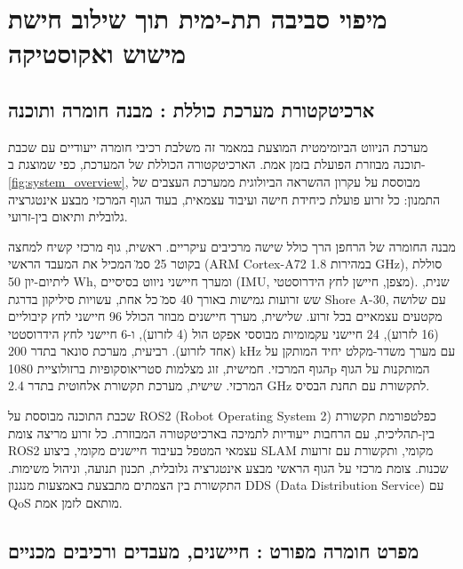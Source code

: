 

\section{מיפוי סביבה תת-ימית תוך שילוב חישת מישוש ואקוסטיקה}
\label{sec:ch07_mapping}

\subsection{ארכיטקטורת מערכת כוללת : מבנה חומרה ותוכנה}
\label{sec:ch07_architecture}

מערכת הניווט הביומימטית המוצעת במאמר זה משלבת רכיבי חומרה ייעודיים עם שכבת תוכנה מבוזרת הפועלת בזמן אמת. הארכיטקטורה הכוללת של המערכת, כפי שמוצגת ב-\ref{fig:system_overview}, מבוססת על עקרון ההשראה הביולוגית ממערכת העצבים של התמנון: כל זרוע פועלת כיחידת חישה ועיבוד עצמאית, בעוד הגוף המרכזי מבצע אינטגרציה גלובלית ותיאום בין-זרועי.

מבנה החומרה של הרחפן הרך כולל שישה מרכיבים עיקריים. ראשית, גוף מרכזי קשיח למחצה בקוטר 25 ס\"מ המכיל את המעבד הראשי (ARM Cortex-A72 במהירות 1.8 GHz), סוללת ליתיום-יון 50 Wh, ומערך חיישני ניווט בסיסיים (IMU, מצפן, חיישן לחץ הידרוסטטי). שנית, שש זרועות גמישות באורך 40 ס\"מ כל אחת, עשויות סיליקון בדרגת Shore A-30, עם שלושה מקטעים עצמאיים בכל זרוע. שלישית, מערך חיישנים מבוזר הכולל 96 חיישני לחץ קיבוליים (16 לזרוע), 24 חיישני עקמומיות מבוססי אפקט הול (4 לזרוע), ו-6 חיישני לחץ הידרוסטטי (אחד לזרוע). רביעית, מערכת סונאר בתדר 200 kHz עם מערך משדר-מקלט יחיד המותקן על הגוף המרכזי. חמישית, זוג מצלמות סטריאוסקופיות ברזולוציית 1080p המותקנות על הגוף המרכזי. שישית, מערכת תקשורת אלחוטית בתדר 2.4 GHz לתקשורת עם תחנת הבסיס.

שכבת התוכנה מבוססת על ROS2 (Robot Operating System 2) כפלטפורמת תקשורת בין-תהליכית, עם הרחבות ייעודיות לתמיכה בארכיטקטורה המבוזרת. כל זרוע מריצה צומת ROS2 עצמאי המטפל בעיבוד חיישנים מקומי, ביצוע SLAM מקומי, ותקשורת עם זרועות שכנות. צומת מרכזי על הגוף הראשי מבצע אינטגרציה גלובלית, תכנון תנועה, וניהול משימות. התקשורת בין הצמתים מתבצעת באמצעות מנגנון DDS (Data Distribution Service) עם QoS מותאם לזמן אמת.

\subsection{מפרט חומרה מפורט : חיישנים, מעבדים ורכיבים מכניים}
\label{sec:ch07_hardware}

